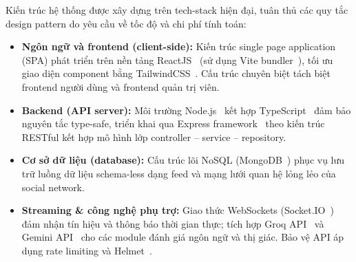 Kiến trúc hệ thống được xây dựng trên tech-stack hiện đại, tuân thủ các quy tắc design pattern do yêu cầu về tốc độ và chi phí tính toán:

\begin{itemize}
    \item \textbf{Ngôn ngữ và frontend (client-side):} Kiến trúc single page application (SPA) phát triển trên nền tảng ReactJS~\cite{ReactJSDocs} (sử dụng Vite bundler~\cite{ViteDocs}), tối ưu giao diện component bằng TailwindCSS~\cite{TailwindCSSDocs}. Cấu trúc chuyên biệt tách biệt frontend người dùng và frontend quản trị viên.

    \item \textbf{Backend (API server):} Môi trường Node.js~\cite{NodeJSDocs} kết hợp TypeScript~\cite{TypeScriptDocs} đảm bảo nguyên tắc type-safe, triển khai qua Express framework~\cite{ExpressJSDocs} theo kiến trúc RESTful kết hợp mô hình lớp controller -- service -- repository.

    \item \textbf{Cơ sở dữ liệu (database):} Cấu trúc lõi NoSQL (MongoDB~\cite{MongoDBDocs}) phục vụ lưu trữ luồng dữ liệu schema-less dạng feed và mạng lưới quan hệ lỏng lẻo của social network.

    \item \textbf{Streaming \& công nghệ phụ trợ:} Giao thức WebSockets (Socket.IO~\cite{SocketIODocs}) đảm nhận tín hiệu và thông báo thời gian thực; tích hợp Groq API~\cite{GroqDocs} và Gemini API~\cite{GeminiAPIDocs} cho các module đánh giá ngôn ngữ và thị giác. Bảo vệ API áp dụng rate limiting và Helmet~\cite{HelmetJS}.
\end{itemize}
